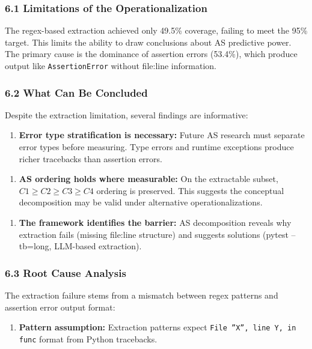 
\subsubsection{6.1 Limitations of the Operationalization}

The regex-based extraction achieved only 49.5\% coverage, failing to meet the 95\% target. This limits the ability to draw conclusions about AS predictive power. The primary cause is the dominance of assertion errors (53.4\%), which produce output like \texttt{AssertionError} without file:line information.

\subsubsection{6.2 What Can Be Concluded}

Despite the extraction limitation, several findings are informative:

\begin{enumerate}
\item \textbf{Error type stratification is necessary:} Future AS research must separate error types before measuring. Type errors and runtime exceptions produce richer tracebacks than assertion errors.
\end{enumerate}

\begin{enumerate}
\item \textbf{AS ordering holds where measurable:} On the extractable subset, $C1\geq C2\geq C3\geq C4$ ordering is preserved. This suggests the conceptual decomposition may be valid under alternative operationalizations.
\end{enumerate}

\begin{enumerate}
\item \textbf{The framework identifies the barrier:} AS decomposition reveals why extraction fails (missing file:line structure) and suggests solutions (pytest --tb=long, LLM-based extraction).
\end{enumerate}

\subsubsection{6.3 Root Cause Analysis}

The extraction failure stems from a mismatch between regex patterns and assertion error output format:

\begin{enumerate}
\item \textbf{Pattern assumption:} Extraction patterns expect \texttt{File ''X'', line Y, in func} format from Python tracebacks.
\end{enumerate}

